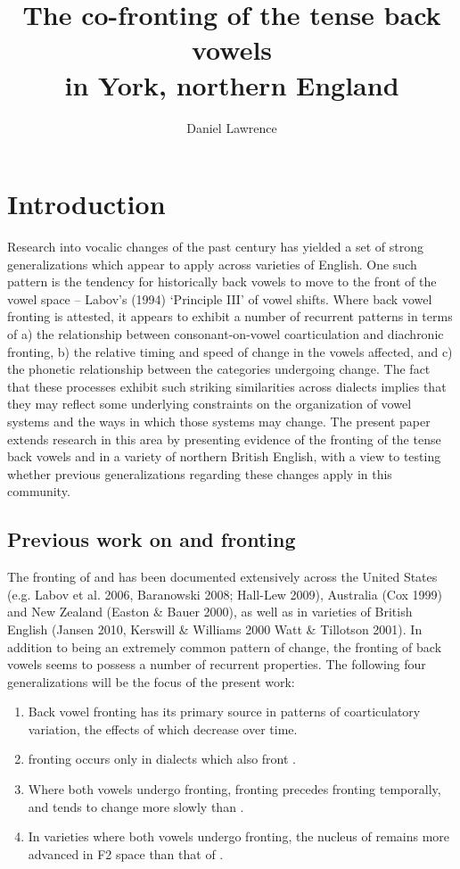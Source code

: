 \documentclass[12pt]{article}
\title{The co-fronting of the tense back vowels\\ in York, northern England}
\author{Daniel Lawrence}
\begin{document}
\maketitle

\section{Introduction}

Research into vocalic changes of the past century has yielded a set of strong generalizations which appear to apply across varieties of English. One such pattern is the tendency for historically back vowels to move to the front of the vowel space -- Labov's (1994) `Principle III' of vowel shifts. Where back vowel fronting is attested, it appears to exhibit a number of recurrent patterns in terms of a) the relationship between consonant-on-vowel coarticulation and diachronic fronting, b) the relative timing and speed of change in the vowels affected, and c) the phonetic relationship between the categories undergoing change. The fact that these processes exhibit such striking similarities across dialects implies that they may reflect some underlying constraints on the organization of vowel systems and the ways in which those systems may change. The present paper extends research in this area by presenting evidence of the fronting of the tense back vowels  and  in a variety of northern British English, with a view to testing whether previous generalizations regarding these changes apply in this community. 

\subsection{Previous work on  and  fronting}

The fronting of  and   has been documented extensively across the United States (e.g. Labov et al. 2006, Baranowski 2008; Hall-Lew 2009), Australia (Cox 1999) and New Zealand (Easton \& Bauer 2000), as well as in varieties of British English (Jansen 2010, Kerswill \& Williams 2000 Watt \& Tillotson 2001). In addition to being an extremely common pattern of change, the fronting of back vowels seems to possess a number of recurrent properties. The following four generalizations will be the focus of the present work:

\begin{enumerate}
\item{Back vowel fronting has its primary source in patterns of coarticulatory variation, the effects of which decrease over time.}
\item{ fronting occurs only in dialects which also front .}
\item{Where both vowels undergo fronting,  fronting precedes  fronting temporally, and  tends to change more slowly than .}
\item{In varieties where both vowels undergo fronting, the nucleus of  remains more advanced in F2 space than that of .}
\end{enumerate}
\end{document}
